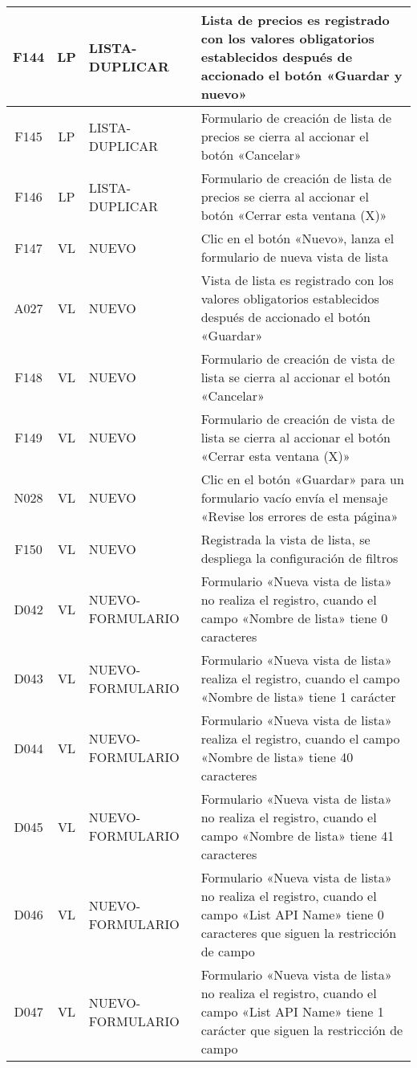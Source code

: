 \begin{landscape}
{\begin{longtable}[htb]{|c|c|p{5.0cm}|p{14.0cm}|}
F144 & LP & LISTA-DUPLICAR & Lista de precios es registrado con los valores obligatorios establecidos después de accionado el botón «Guardar y nuevo» \\ \hline
F145 & LP & LISTA-DUPLICAR & Formulario de creación de lista de precios se cierra al accionar el botón «Cancelar» \\ \hline
F146 & LP & LISTA-DUPLICAR & Formulario de creación de lista de precios se cierra al accionar el botón «Cerrar esta ventana (X)» \\ \hline
F147 & VL & NUEVO & Clic en el botón «Nuevo», lanza el formulario de nueva vista de lista \\ \hline
A027 & VL & NUEVO & Vista de lista es registrado con los valores obligatorios establecidos después de accionado el botón «Guardar» \\ \hline
F148 & VL & NUEVO & Formulario de creación de vista de lista se cierra al accionar el botón «Cancelar» \\ \hline
F149 & VL & NUEVO & Formulario de creación de vista de lista se cierra al accionar el botón «Cerrar esta ventana (X)» \\ \hline
N028 & VL & NUEVO & Clic en el botón «Guardar» para un formulario vacío envía el mensaje «Revise los errores de esta página» \\ \hline
F150 & VL & NUEVO & Registrada la vista de lista, se despliega la configuración de filtros \\ \hline
D042 & VL & NUEVO-FORMULARIO & Formulario «Nueva vista de lista» no realiza el registro, cuando el campo «Nombre de lista» tiene 0 caracteres \\ \hline
D043 & VL & NUEVO-FORMULARIO & Formulario «Nueva vista de lista» realiza el registro, cuando el campo «Nombre de lista» tiene 1 carácter \\ \hline
D044 & VL & NUEVO-FORMULARIO & Formulario «Nueva vista de lista» realiza el registro, cuando el campo «Nombre de lista» tiene 40 caracteres \\ \hline
D045 & VL & NUEVO-FORMULARIO & Formulario «Nueva vista de lista» no realiza el registro, cuando el campo «Nombre de lista» tiene 41 caracteres \\ \hline
D046 & VL & NUEVO-FORMULARIO & Formulario «Nueva vista de lista» no realiza el registro, cuando el campo «List API Name» tiene 0 caracteres que siguen la restricción de campo \\ \hline
D047 & VL & NUEVO-FORMULARIO & Formulario «Nueva vista de lista» no realiza el registro, cuando el campo «List API Name» tiene 1 carácter que siguen la restricción de campo \\ \hline

\end{longtable}}
\end{landscape}
